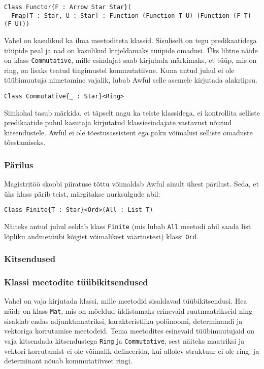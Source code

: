 \documentclass[12pt]{article}
\begin{document}
      \begin{verbatim}Class Functor{F : Arrow Star Star}(
  Fmap[T : Star, U : Star] : Function (Function T U) (Function (F T) (F U)))\end{verbatim}

      Vahel on kasulikud ka ilma meetoditeta klassid. Sisuliselt on tegu predikaatidega tüüpide peal ja nad on kasulikud kirjeldamaks tüüpide omadusi. Üks lihtne näide on klass \verb!Commutative!, mille esindajat saab kirjutada märkimaks, et tüüp, mis on ring, on lisaks teatud tingimustel kommutatiivne. Kuna antud juhul ei ole tüübimuutuja nimetamine vajalik, lubab Awful selle asemele kirjutada alakriipsu.

      \begin{verbatim}Class Commutative{_ : Star}<Ring>\end{verbatim}

      Siinkohal tasub märkida, et täpselt nagu ka teiste klassidega, ei kontrollita selliste predikaatide puhul kasutaja kirjutatud klassiesindajate vastavust nõutud kitsendustele. Awful ei ole tõestusassistent ega paku võimalusi selliste omaduste tõestamiseks.
      \subsubsection{Pärilus}
        Magistritöö skoobi piiratuse tõttu võimaldab Awful ainult ühest pärilust. Seda, et üks klass pärib teist, märgitakse nurksulgude abil:

        \begin{verbatim}Class Finite{T : Star}<Ord>(All : List T)\end{verbatim}

        Näiteks antud juhul eeldab klass \verb!Finite! (mis lubab \verb!All! meetodi abil saada list lõpliku andmetüübi kõigist võimalikest väärtustest) klassi \verb!Ord!.
      \subsubsection{Kitsendused}
        
      \subsubsection{Klassi meetodite tüübikitsendused}
        Vahel on vaja kirjutada klassi, mille meetodid sisaldavad tüübikitsendusi. Hea näide on klass \verb!Mat!, mis on mõeldud üldistamaks erinevaid ruutmaatrikseid ning sisaldab endas adjunktmaatriksi, karakteristliku polünoomi, determinandi ja vektoriga korrutamise meetodeid. Tema meetodites esinevaid tüübimuutujaid on vaja kitsendada kitsendustega \verb!Ring! ja \verb!Commutative!, sest näiteks maatriksi ja vektori korrutamist ei ole võimalik defineerida, kui allolev struktuur ei ole ring, ja determinant nõuab kommutatiivset ringi.
\end{document}
